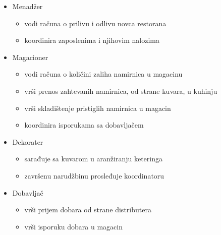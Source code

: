 \begin{itemize}
\begin{itemize}
    \end{itemize}
        \item Menadžer
    \begin{itemize}
        \item vodi računa o prilivu i odlivu novca restorana
        \item koordinira zaposlenima i njihovim nalozima
    \end{itemize}
    \newpage
    \item Magacioner
    \begin{itemize}
        \item vodi računa o količini zaliha namirnica u magacinu
        \item vrši prenos zahtevanih namirnica, od strane kuvara, u kuhinju
        \item vrši skladištenje pristiglih namirnica u magacin
        \item koordinira isporukama sa dobavljačem
    \end{itemize}
    \item Dekorater
    \begin{itemize}
        \item sarađuje sa kuvarom u aranžiranju keteringa
        \item završenu narudžbinu prosleđuje koordinatoru
    \end{itemize}
    \item Dobavljač
    \begin{itemize}
        \item vrši prijem dobara od strane distributera
        \item vrši isporuku dobara u magacin
    \end{itemize}
\end{itemize}


